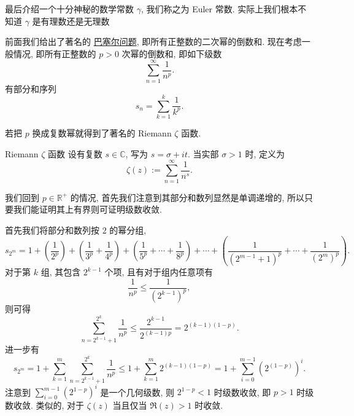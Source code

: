\documentclass[cn,toc=twocol]{elegantbook}
\newcommand{\R}{\mathbb{R}}
\newcommand{\C}{\mathbb{C}}
\begin{document}
最后介绍一个十分神秘的数学常数 $\gamma$, 我们称之为 Euler 常数. 实际上我们根本不知道 $\gamma$ 是有理数还是无理数

前面我们给出了著名的 \hyperref[thm:basel]{巴塞尔问题}, 即所有正整数的二次幂的倒数和. 现在考虑一般情况, 即所有正整数的 $p > 0$ 次幂的倒数和, 即如下级数
\[
	\sum_{n = 1}^{\infty} \frac{1}{n^p}.
\]
有部分和序列
\[
	s_n = \sum_{k = 1}^{k} \frac{1}{k^p}.
\]

若把 $p$ 换成复数幂就得到了著名的 Riemann $\zeta$ 函数.

\begin{definition}{Riemann $\zeta$ 函数}
	设有复数 $s \in \C$, 写为 $s = \sigma + it$. 当实部 $\sigma > 1$ 时, 定义为
	\[
		\zeta(z) := \sum_{n = 1}^{\infty} \frac{1}{n^s}.
	\]
\end{definition}

我们回到 $p \in \R^+$ 的情况, 首先我们注意到其部分和数列显然是单调递增的, 所以只要我们能证明其上有界则可证明级数收敛. 

首先我们将部分和数列按 $2$ 的幂分组,
\[
s_{2^m} = 1 + \left(\frac1{2^p}\right) + \left(\frac1{3^p}+\frac1{4^p}\right) + \left(\frac1{5^p}+\cdots+\frac1{8^p}\right) + \cdots + \left(\frac1{(2^{m-1}+1)^p} + \cdots+\frac1{(2^m)^p}\right).
\]
对于第 $k$ 组, 其包含 $2^{k-1}$ 个项, 且有对于组内任意项有
\[
	\frac1{n^p} \le \frac1{(2^{k-1})^p},
\]
则可得
\[
	\sum_{n = 2^{k-1}+1}^{2^k} \frac1{n^p} \le \frac{2^{k-1}}{2^{(k-1)p}} = 2^{(k-1)(1-p)}.
\]
进一步有
\[
	s_{2^m} = 1 + \sum_{k=1}^{m}\sum_{n = 2^{k-1}+1}^{2^k} \frac1{n^p} \le 1 + \sum_{k=1}^{m} 2^{(k-1)(1-p)} = 1 + \sum_{i = 0}^{m-1} \left(2^{(1-p)}\right)^{i}.
\]
注意到 $\sum\limits_{i = 0}^{m-1} \left(2^{1-p}\right)^{i}$ 是一个几何级数, 则 $2^{1-p} < 1$ 时级数收敛, 即 $p > 1$ 时级数收敛. 类似的, 对于 $\zeta(z)$ 当且仅当 $\Re (z) > 1$ 时收敛.
  
\end{document}
